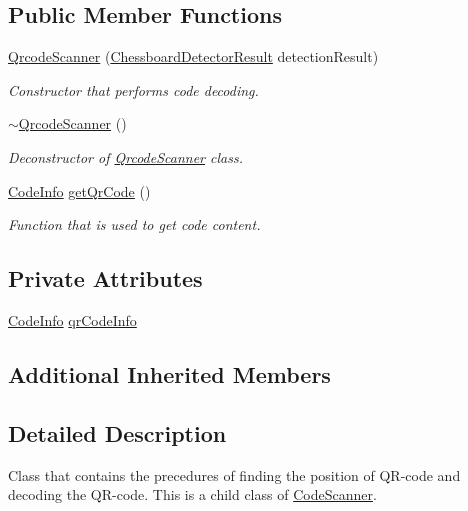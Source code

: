 \subsection*{Public Member Functions}
\begin{DoxyCompactItemize}
\item 
\hyperlink{class_qrcode_scanner_a92f9835aab64e4129ae9efcd72bc7518}{Qrcode\+Scanner} (\hyperlink{struct_chessboard_detector_result}{Chessboard\+Detector\+Result} detection\+Result)
\begin{DoxyCompactList}\small\item\em Constructor that performs code decoding. \end{DoxyCompactList}\item 
\hyperlink{class_qrcode_scanner_ad8670545dad4e8918b94f870f184ce80}{$\sim$\+Qrcode\+Scanner} ()
\begin{DoxyCompactList}\small\item\em Deconstructor of \hyperlink{class_qrcode_scanner}{Qrcode\+Scanner} class. \end{DoxyCompactList}\item 
\hyperlink{struct_code_info}{Code\+Info} \hyperlink{class_qrcode_scanner_ae2f75fcf7fbe48678a57c2e0eb3ca163}{get\+Qr\+Code} ()
\begin{DoxyCompactList}\small\item\em Function that is used to get code content. \end{DoxyCompactList}\end{DoxyCompactItemize}
\subsection*{Private Attributes}
\begin{DoxyCompactItemize}
\item 
\hyperlink{struct_code_info}{Code\+Info} \hyperlink{class_qrcode_scanner_af93303c867d09d136c94015610071c91}{qr\+Code\+Info}
\end{DoxyCompactItemize}
\subsection*{Additional Inherited Members}


\subsection{Detailed Description}
Class that contains the precedures of finding the position of Q\+R-\/code and decoding the Q\+R-\/code. This is a child class of \hyperlink{class_code_scanner}{Code\+Scanner}. 

